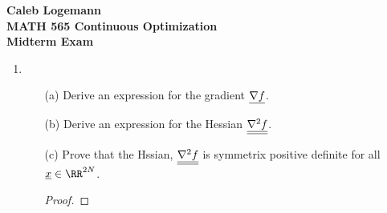 \documentclass[11pt, oneside]{article}
\begin{document}
\noindent \textbf{\Large{Caleb Logemann \\
MATH 565 Continuous Optimization \\
Midterm Exam
}}

%
\begin{enumerate}
  \item %
    \begin{enumerate}
      \item[(a)]
        Derive an expression for the gradient $\underline{\nabla f}$.

        
      \item[(b)]
        Derive an expression for the Hessian $\underline{\underline{\nabla^2 f}}$.
      \item[(c)]
        Prove that the Hssian, $\underline{\underline{\nabla^2 f}}$ is symmetrix positive definite
        for all $\v{x} \in \RR^{2N}$.

        \begin{proof}
          
        \end{proof}
    \end{enumerate}

\end{enumerate}
\end{document}
